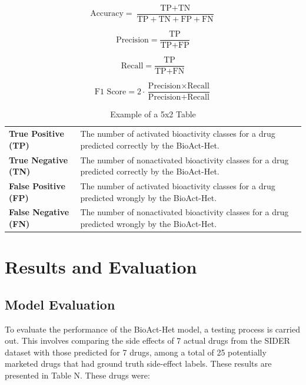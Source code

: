 \documentclass[conference]{IEEEtran}
\begin{document}
\[
  \text{Accuracy} = \frac{\text{TP} + \text{TN}}{\text{TP} + \text{TN} + \text{FP} + \text{FN}}
\]

\[
  \text{Precision} = \frac{\text{TP}}{\text{TP} + \text{FP}}
\]

\[
  \text{Recall} = \frac{\text{TP}}{\text{TP} + \text{FN}}
\]

\[
  \text{F1 Score} = 2 \cdot \frac{\text{Precision} \times \text{Recall}}{\text{Precision} + \text{Recall}}
\]

\begin{table}[h!]
  \centering
  \caption{Example of a 5x2 Table}
  \label{tab:Prediction_Definition}
  \begin{tabular}{|>{\raggedright\arraybackslash}p{2.5cm}|>{\raggedright\arraybackslash}p{6cm}|}
    \hline
    \rowcolor{headercolor}
    \multicolumn{1}{|c|}{\textbf{Prediction}} & \multicolumn{1}{c|}{\textbf{Definition}}                                                         \\ \hline
    \textbf{True Positive (TP)}               & The number of activated bioactivity classes for a drug predicted correctly by the BioAct-Het.    \\ \hline
    \textbf{True Negative (TN)}               & The number of nonactivated bioactivity classes for a drug predicted correctly by the BioAct-Het. \\ \hline
    \textbf{False Positive (FP)}              & The number of activated bioactivity classes for a drug predicted wrongly by the BioAct-Het.      \\ \hline
    \textbf{False Negative (FN)}              & The number of nonactivated bioactivity classes for a drug predicted wrongly by the BioAct-Het.   \\ \hline
  \end{tabular}
\end{table}


\section{Results and Evaluation}
\subsection{Model Evaluation}
To evaluate the performance of the BioAct-Het model, a testing process is carried out. This involves comparing the side effects of 7 actual drugs from the SIDER dataset with those predicted for 7 drugs, among a total of 25 potentially marketed drugs that had ground truth side-effect labels. These results are presented in Table N.
These drugs were:\\[6pt]
\end{document}
